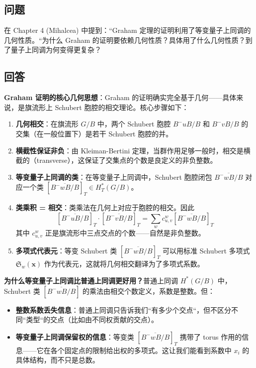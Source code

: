 \subsection{问题}
在 Chapter 4 (Mihalcea) 中提到：``Graham 定理的证明利用了等变量子上同调的几何性质。``为什么 Graham 的证明要依赖几何性质？具体用了什么几何性质？到了量子上同调为何变得更复杂？
\subsection{回答}
\textbf{Graham 证明的核心几何思想}：Graham 的证明确实完全基于几何——具体来说，是旗流形上 Schubert 胞腔的相交理论。核心步骤如下：
\begin{enumerate}
\item \textbf{几何相交}：在旗流形 $G/B$ 中，两个 Schubert 胞腔 $B^-uB/B$ 和 $B^-vB/B$ 的交集（在一般位置下）是若干 Schubert 胞腔的并。
\item \textbf{横截性保证非负}：由 Kleiman-Bertini 定理，当群作用足够一般时，相交是横截的（transverse），这保证了交集点的个数是良定义的非负整数。
\item \textbf{等变量子上同调的类}：在等变量子上同调中，Schubert 胞腔闭包 $\overline{B^-wB/B}$ 对应一个类 $[\overline{B^-wB/B}]_T \in H_T^*(G/B)$。
\item \textbf{类乘积 = 相交}：类乘法在几何上对应于胞腔的相交。因此
\[[\overline{B^-uB/B}]_T \cdot [\overline{B^-vB/B}]_T = \sum_w c_{u,v}^w [\overline{B^-wB/B}]_T\]
其中 $c_{u,v}^w$ 正是旗流形中三点交点的个数——自然是非负整数。
\item \textbf{多项式代表元}：等变 Schubert 类 $[\overline{B^-wB/B}]_T$ 可以用标准 Schubert 多项式 $\mathfrak{S}_w(\mathbf{x})$ 作为代表元，这就将几何相交翻译为了多项式系数。
\end{enumerate}

\textbf{为什么等变量子上同调比普通上同调更好用？}普通上同调 $H^*(G/B)$ 中，Schubert 类 $[\overline{B^-wB/B}]$ 的乘法由相交个数定义，系数是整数。但：
\begin{itemize}
\item \textbf{整数系数丢失信息}：普通上同调只告诉我们``有多少个交点``，但不区分不同``类型``的交点（比如由不同权贡献的交点）。
\item \textbf{等变量子上同调保留权的信息}：等变类 $[\overline{B^-wB/B}]_T$ 携带了 torus 作用的信息——它在各个固定点的限制给出权的多项式。这让我们能看到系数中 $x_i$ 的具体结构，而不只是总数。
\end{itemize}

